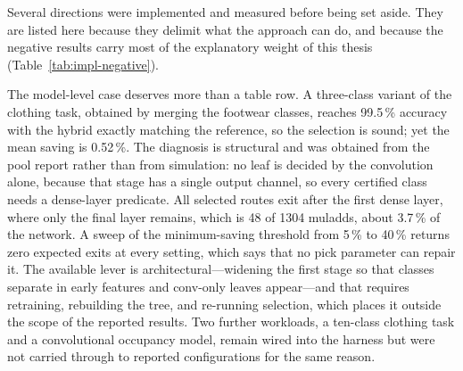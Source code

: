 Several directions were implemented and measured before being set aside.
They are listed here because they delimit what the approach can do, and because the negative results carry most of the explanatory weight of this thesis (Table~\ref{tab:impl-negative}).

The model-level case deserves more than a table row.
A three-class variant of the clothing task, obtained by merging the footwear classes, reaches 99.5\,\% accuracy with the hybrid exactly matching the reference, so the selection is sound; yet the mean saving is 0.52\,\%.
The diagnosis is structural and was obtained from the pool report rather than from simulation: no leaf is decided by the convolution alone, because that stage has a single output channel, so every certified class needs a dense-layer predicate.
All selected routes exit after the first dense layer, where only the final layer remains, which is 48 of 1304 muladds, about 3.7\,\% of the network.
A sweep of the minimum-saving threshold from 5\,\% to 40\,\% returns zero expected exits at every setting, which says that no pick parameter can repair it.
The available lever is architectural---widening the first stage so that classes separate in early features and conv-only leaves appear---and that requires retraining, rebuilding the tree, and re-running selection, which places it outside the scope of the reported results.
Two further workloads, a ten-class clothing task and a convolutional occupancy model, remain wired into the harness but were not carried through to reported configurations for the same reason.

